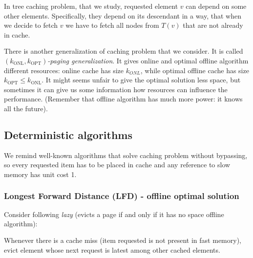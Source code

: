 In tree caching problem, that we study, requested element $v$ can depend 
on some other elements. Specifically, they depend on its descendant in a 
way, that when we decide to fetch $v$ we have to fetch all nodes from $T(v)$ 
that are not already in cache.

There is another generalization of caching problem that we consider. It is 
called $(k_{\mathrm{ONL}}, k_{\mathrm{OPT}})$\textit{-paging generalization}. 
It gives online and 
optimal offline algorithm different resources: online cache has size $k_{ONL}$, 
while optimal offline cache has size $k_{\mathrm{OPT}} \leq k_{\mathrm{ONL}}$. 
It might seems 
unfair to give the optimal solution less space, but sometimes it can give us 
some information how resources can influence the performance. (Remember 
that offline algorithm has much more power: it knows all the future). 

\subsection{Deterministic algorithms}
We remind well-known algorithms that solve caching problem without bypassing, 
so every requested item has to be placed in cache and any reference to 
slow memory has unit cost 1.
\subsubsection{Longest Forward Distance (LFD) - offline optimal solution}
Consider following \textit{lazy} (evicts a page if and only if it has no space  
offline algorithm): 
\begin{myalgo}
Whenever there is a cache miss (item requested is not 
present in fast memory), evict element whose next request is latest among other 
cached elements.
\end{myalgo}


